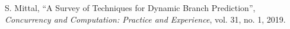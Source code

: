 \begin{thebibliography}{99}

    S. Mittal,
    ``A Survey of Techniques for Dynamic Branch Prediction'',  
    \textit{Concurrency and Computation: Practice and Experience},
    vol. 31, no. 1, 
    2019.
    
\end{thebibliography}
